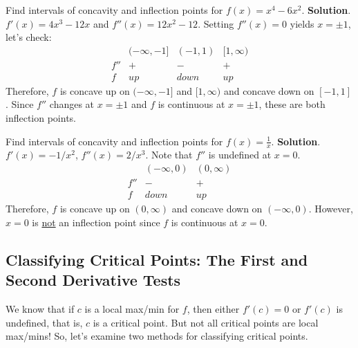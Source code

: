 \begin{Example}{}{}
    Find intervals of concavity and inflection points for $ f(x)=x^4-6x^2 $.
    \tcblower{}
    \textbf{Solution}. $ f'(x)=4x^3-12x $ and $ f''(x)=12x^2-12 $.
    Setting $ f''(x)=0 $ yields $ x=\pm 1 $, let's check:
    \[ \begin{array}{cccc}
                & (-\infty,-1] & (-1,1) & [1,\infty) \\
            f'' & +            & -      & +          \\
            f   & up           & down   & up
        \end{array} \]
    Therefore, $ f $ is concave up on $ (-\infty,-1] $ and $ [1,\infty) $ and concave down on $ [-1,1] $. Since
    $ f'' $ changes at $ x=\pm 1 $ and $ f $ is continuous at $ x=\pm 1 $, these are both inflection points.
\end{Example}
\begin{Example}{}{}
    Find intervals of concavity and inflection points for $ f(x)=\frac{1}{x} $.
    \tcblower{}
    \textbf{Solution}. $ f'(x)=-1/x^2 $, $ f''(x)=2/x^3 $. Note that $ f'' $ is undefined at $ x=0 $.
    \[ \begin{array}{ccc}
                & (-\infty,0) & (0,\infty) \\
            f'' & -           & +          \\
            f   & down        & up
        \end{array} \]
    Therefore, $ f $ is concave up on $ (0,\infty) $ and concave down on $ (-\infty,0) $. However, $ x=0 $
    is \underline{not} an inflection point since $ f $ is continuous at $ x=0 $.
\end{Example}
\subsection{Classifying Critical Points: The First and Second Derivative Tests}
We know that if $ c $ is a local max/min for $ f $, then either $ f'(c)=0 $
or $ f'(c) $ is undefined, that is, $ c $ is a critical point. But not all critical points
are local max/mins! So, let's examine two methods for classifying critical points.
